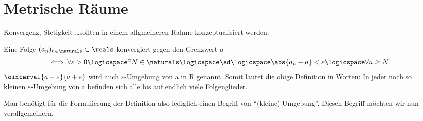 \chapter{Metrische Räume}
\begin{ziel*}
    Konvergenz, Stetigkeit \ldots sollten in einem allgmeineren Rahme konzeptualisiert werden.
\end{ziel*}
\begin{erinnerung*}
    Eine Folge \( (a_n)_{n\in \naturals}\subset \reals \) konvergiert gegen den Grenzwert \( a \)
    \begin{align*}
        \iff \forall \varepsilon>0 \logicspace\exists N\in \naturals\logicspace\text{\sd}\logicspace \abs{a_n-a}<\varepsilon\logicspace\forall n \geq N
    \end{align*}
    \( \ointerval{a-\varepsilon}{a+\varepsilon} \) wird auch \( \varepsilon \)-Umgebung von a in R genannt. 
    Somit lautet die obige Definition in Worten: 
    In jeder noch so kleinen \( \varepsilon \)-Umgebung von a befinden sich alle bis auf endlich viele Folgenglieder.    
\end{erinnerung*}
Man benötigt für die Formulierung der Definition also lediglich einen Begriff von \enquote{(kleine) Umgebung}. 
Diesen Begriff möchten wir nun verallgemeinern.
    
